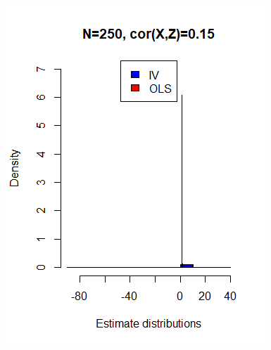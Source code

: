 \documentclass[a4paper,12pt,oneside,English]{article}
\begin{document}
\begin{figure}[p!]
\begin{minipage}[b]{0.5\linewidth}
        \includegraphics[width=\linewidth]{Fig3A.png}
    \end{minipage}
    \begin{minipage}[b]{0.5\linewidth}

\end{minipage}
\end{figure}
\end{document}
